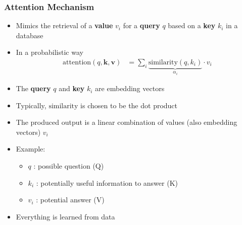 \documentclass[10pt]{beamer}
\begin{document}
\begin{frame}
  \frametitle{Attention Mechanism}
 
\begin{itemize}[<+->]
\item Mimics the retrieval of a \textbf{value} $v_i$ for a \textbf{query} $q$
based on a \textbf{key} $k_i$ in a database
\item In a probabilistic way
\begin{align*}
\text{attention}(q,\textbf{k},\textbf{v}) & = \sum_i \underbrace{\text{similarity}(q,k_i)}_{\alpha_i}\cdot v_i
\end{align*}
\item The \textbf{query} $q$ and \textbf{key} $k_i$ are embedding vectors
\item Typically, $\text{similarity}$ is chosen to be the dot product
\item The produced output is a linear combination of values (also embedding vectors) $v_i$
\item Example:
\begin{itemize}
\item $q$ : possible question (Q)
\item $k_i$ : potentially useful information to answer (K)
\item $v_i$ : potential answer (V)
\end{itemize}
\item Everything is learned from data
\end{itemize}
\end{frame}
\end{document}
